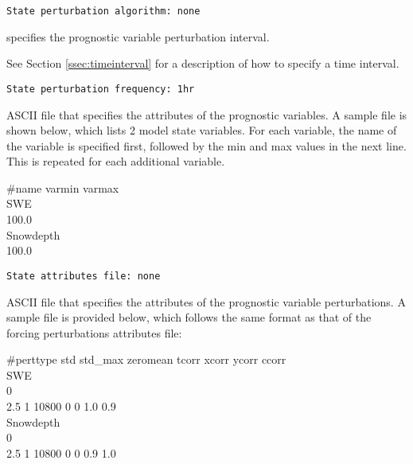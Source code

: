  \begin{Verbatim}[frame=single]
State perturbation algorithm: none
 \end{Verbatim}

 
  specifies the prognostic variable
 perturbation interval.

 See Section \ref{ssec:timeinterval} for a description
 of how to specify a time interval.
 

 \begin{Verbatim}[frame=single]
State perturbation frequency: 1hr
 \end{Verbatim}

 
  ASCII file that specifies
 the attributes of the prognostic variables. 
 A sample file is shown below, which lists 2 model state
 variables. For each variable, the name of the variable is 
 specified first, followed by the min and max values in the 
 next line. This is repeated for each additional variable.  

 \#name  varmin  varmax \\
 \indent SWE                    \\
    100.0            \\
 \indent Snowdepth              \\
    100.0
 

 \begin{Verbatim}[frame=single]
State attributes file: none
 \end{Verbatim}

 
  ASCII file that specifies
 the attributes of the prognostic variable perturbations. 
 A sample file is provided below, which follows the same format 
 as that of the forcing perturbations attributes file: 

 \#perttype  std    std\_max   zeromean  tcorr  xcorr ycorr ccorr \\
 \indent SWE                                                      \\
     0                                                   \\
    2.5       1        10800   0    0    1.0  0.9     \\
 \indent Snowdepth                                                \\
     0                                                   \\
     2.5       1        10800   0    0    0.9  1.0
 

